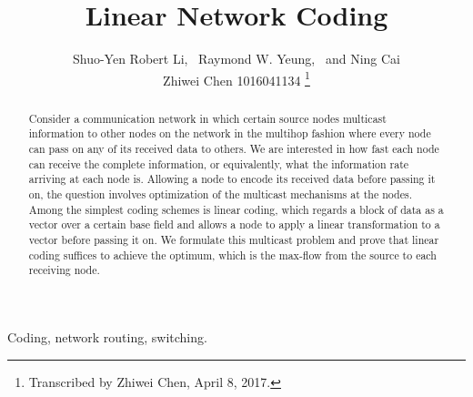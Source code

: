 \documentclass{IEEEtran}
\begin{document}
\title{Linear Network Coding}
	\author{Shuo-Yen Robert Li,\  Raymond W. Yeung,\  and Ning Cai\\
	Zhiwei Chen 1016041134
	\thanks{Transcribed by Zhiwei Chen, April 8, 2017.}}
\maketitle
	

\begin{abstract}
	Consider a communication network in which certain source nodes multicast information to other nodes on the network in the multihop fashion where every node can pass on any of its received data to others. We are interested in how fast each node can receive the complete information, or equivalently, what the information rate arriving at each node is. Allowing a node to encode its received data before passing it on, the question involves optimization of the multicast mechanisms at the nodes. Among the simplest coding schemes is linear coding, which regards a block of data as a vector over a certain base field and allows a node to apply a linear transformation to a vector before passing it on. We formulate this multicast problem and prove that linear coding suffices to achieve the optimum, which is the max-flow from the source to each receiving 	node.
\end{abstract}
\begin{IEEEkeywords}
	Coding, network routing, switching.
\end{IEEEkeywords}
\end{document}
